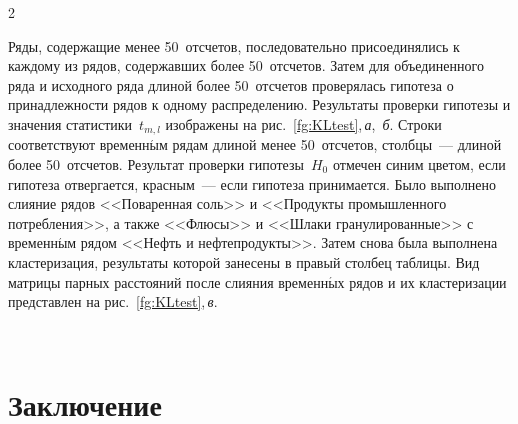 \begin{multicols}{2}

Ряды, содержащие менее 50~отсчетов, последовательно присоединялись к
каждому из рядов, содержавших более 50~отсчетов. Затем для объединенного
ряда и исходного ряда длиной более 50~отсчетов проверялась гипотеза о
при\-над\-леж\-ности  рядов к одному распределению. Результаты проверки гипотезы
и значения статистики~$t_{m,l}$ изоб\-ра\-же\-ны на рис.~\ref{fg:KLtest},\,\textit{а},~\textit{б}.
Строки соответствуют временн$\acute{\mbox{ы}}$м рядам длиной менее 50~отсчетов,
столбцы~--- длиной более 50~отсчетов. Результат проверки гипотезы~$H_0$
отмечен синим цветом, если гипотеза отвергается, красным~--- если гипотеза
принимается. Было выполнено слияние рядов <<Поваренная соль>> и
<<Продукты промышленного потребления>>, а также <<Флюсы>> и
<<Шлаки гранулированные>> с временн$\acute{\mbox{ы}}$м рядом <<Нефть и нефтепродукты>>.
Затем снова была выполнена кластеризация, результаты которой занесены в
правый столбец таблицы. Вид матрицы парных расстояний после слияния
временн$\acute{\mbox{ы}}$х рядов и их кластеризации представлен на
рис.~\ref{fg:KLtest},\,\textit{в}.

\begin{figure*} %
\vspace*{1pt}
\begin{center}
\mbox{%
\epsfxsize=161.515mm
}
\end{center}
\vspace*{-9pt}
\label{fg:KLtest}
\end{figure*}






\section{Заключение}


\end{multicols}
